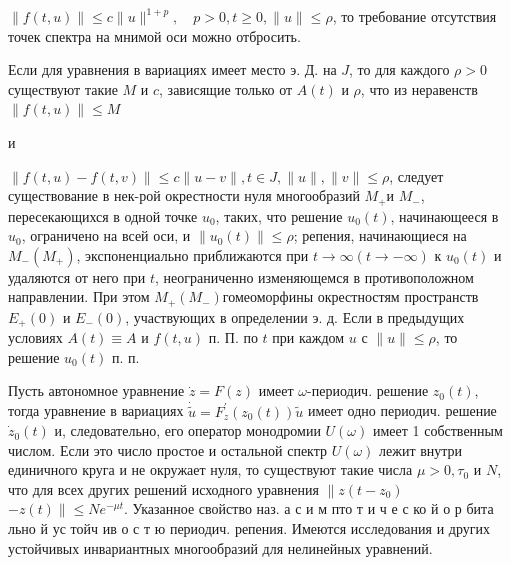\documentclass[10pt]{article}
\begin{document}
$\|f(t, u)\| \leqslant c\|u\|^{1+p}, \quad p>0, t \geqslant 0,\|u\| \leqslant \rho$, то требование отсутствия точек спектра на мнимой оси можно отбросить.



Если для уравнения в вариациях имеет место э. Д. на $J$, то для каждого $\rho>0$ существуют такие $M$ и $c$, зависящие только от $A(t)$ и $\rho$, что из неравенств $\|f(t, u)\| \leqslant M$



и



$\|f(t, u)-f(t, v)\| \leqslant c\|u-v\|, t \in J,\|u\|,\|v\| \leqslant \rho$, следует существование в нек-рой окрестности нуля многообразий $M_{+}$и $M_{-}$, пересекающихся в одной точке $u_{0}$, таких, что решение $u_{0}(t)$, начинающееся в $u_{0}$, ограничено на всей оси, и $\left\|u_{0}(t)\right\| \leqslant \rho$; репения, начинающиеся на $M_{-}\left(M_{+}\right)$, экспоненциально приближаются при $t \rightarrow \infty(t \rightarrow-\infty)$ к $u_{0}(t)$ и удаляются от него при $t$, неограниченно изменяющемся в противоположном направлении. При этом $M_{+}\left(M_{-}\right)$гомеоморфины окрестностям пространств $E_{+}(0)$ и $E_{-}(0)$, участвующих в определении э. д. Если в предыдущих условиях $A(t) \equiv A$ и $f(t, u)$ п. П. по $t$ при каждом $u$ с $\|u\| \leqslant \rho$, то решение $u_{0}(t)$ п. п.



Пусть автономное уравнение $\dot{z}=F(z)$ имеет $\omega$-периодич. решение $z_{0}(t)$, тогда уравнение в вариациях $\dot{\tilde{u}}=F_{z}^{\prime}\left(z_{0}(t)\right) \tilde{u}$ имеет одно периодич. решение $\dot{z}_{0}(t)$ и, следовательно, его оператор монодромии $U(\omega)$ имеет 1 собственным числом. Если это число простое и остальной спектр $U(\omega)$ лежит внутри единичного круга и не окружает нуля, то существуют такие числа $\mu>0, \tau_{0}$ и $N$, что для всех других решений исходного уравнения $\| z\left(t-z_{0}\right)$ $-z(t) \| \leqslant N e^{-\mu t}$. Указанное свойство наз. а с и м пто т и ч е с ко й $о$ р бита льно й ус тойч ив о с т ю периодич. репения. Имеются исследования и других устойчивых инвариантных многообразий для нелинейных уравнений.
\end{document}
